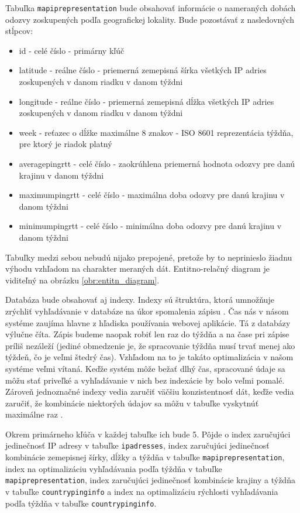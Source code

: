 Tabuľka \lstinline{mapiprepresentation} bude obsahovať informácie o nameraných dobách 
odozvy zoskupených podľa geografickej lokality. Bude pozostávať z nasledovných stĺpcov:
\begin{itemize}
    \item id - celé číslo - primárny kľúč
    \item latitude - reálne číslo - priemerná zemepisná šírka všetkých IP adries zoskupených v danom riadku v danom týždni
    \item longitude - reálne číslo - priemerná zemepisná dĺžka všetkých IP adries zoskupených v danom riadku v danom týždni
    \item week - reťazec o dĺžke maximálne 8 znakov - ISO 8601 reprezentácia týždňa, pre ktorý je riadok platný
    \item averagepingrtt - celé číslo - zaokrúhlena priemerná hodnota odozvy pre danú krajinu v danom týždni
    \item maximumpingrtt - celé číslo - maximálna doba odozvy pre danú krajinu v danom týždni
    \item minimumpingrtt - celé číslo - minimálna doba odozvy pre danú krajinu v danom týždni
\end{itemize}

Tabuľky medzi sebou nebudú nijako prepojené, pretože by to neprinieslo žiadnu výhodu vzhľadom na charakter 
meraných dát. Entitno-relačný diagram je viditeľný na obrázku \ref{obr:entitn_diagram}.

Databáza bude obsahovať aj indexy. Indexy sú štruktúra, ktorá umnožňuje zrýchliť vyhľadávanie v databáze na úkor spomalenia zápisu \cite{db_index}. 
Čas nás v násom systéme zaujíma hlavne z hľadiska používania webovej aplikácie. Tá z databázy výlučne číta. Zápis budeme naopak robiť len raz do týždňa 
a na čase pri zápise príliš nezáleží (jediné obmedzenie je, že spracovanie týždňa musí trvať menej ako týždeň, čo je veľmi štedrý čas). Vzhľadom na to je 
takáto optimalizácia v našom systéme veľmi vítaná. Keďže systém môže bežať dlhý čas, spracované údaje sa môžu stať priveľké a vyhľadávanie v nich bez 
indexácie by bolo veľmi pomalé. Zároveň jednoznačné indexy vedia zaručiť väčšiu konzistentnosť dát, keďže vedia zaručiť, že kombinácie niektorých údajov 
sa môžu v tabuľke vyskytnúť maximálne raz \cite{index_strategy}.

Okrem primárneho kľúča v každej tabuľke ich bude 5. Pôjde o index zaručujúci jedinečnosť IP adresy v tabuľke 
\lstinline{ipadresses}, index zaručujúci jedinečnosť kombinácie zemepisnej šírky, dĺžky a týždňa v tabuľke \lstinline{mapiprepresentation}, index na 
optimalizáciu vyhľadávania podľa týždňa v tabuľke \lstinline{mapiprepresentation}, index zaručujúci jedinečnosť kombinácie krajiny a týždňa v tabuľke 
\lstinline{countrypinginfo} a index na optimalizáciu rýchlosti vyhľadávania podľa týždňa v tabuľke \lstinline{countrypinginfo}.

